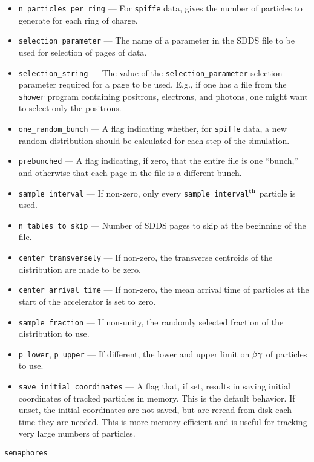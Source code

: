 \documentclass[11pt]{article}
\begin{document}
\begin{itemize}
\item \verb|n_particles_per_ring| --- For {\tt spiffe} data, gives the number of particles to
generate for each ring of charge.
\item \verb|selection_parameter| --- The name of a parameter in the SDDS file to be used for selection
of pages of data.
\item \verb|selection_string| --- The value of the
\verb|selection_parameter| selection parameter required for a page to
be used.  E.g., if one has a file from the {\tt shower} program
containing positrons, electrons, and photons, one might want to select
only the positrons.
\item \verb|one_random_bunch| --- A flag indicating whether, for {\tt spiffe} data, a new random
distribution should be calculated for each step of the simulation.
\item \verb|prebunched| --- A flag indicating, if zero, that the entire file is one ``bunch,'' and otherwise that each page in the file is a different bunch.
\item \verb|sample_interval| --- If non-zero, only every \verb|sample_interval|$^{\rm th}$ particle is used.
\item \verb|n_tables_to_skip| --- Number of SDDS pages to skip at the beginning of the file.
\item \verb|center_transversely| --- If non-zero, the transverse centroids of the distribution are made to be zero.
\item \verb|center_arrival_time| --- If non-zero, the mean arrival time of particles at the start of the
accelerator is set to zero.
\item \verb|sample_fraction| --- If non-unity, the randomly selected fraction of the distribution to use.
\item \verb|p_lower|, \verb|p_upper| --- If different, the lower and upper limit on ${\rm \beta\gamma}$ of particles to use.
\item \verb|save_initial_coordinates| --- A flag that, if set, results in saving initial coordinates
of tracked particles in memory.  This is the default behavior.  If unset, the initial coordinates
are not saved, but are reread from disk each time they are needed.  This is more memory efficient
and is useful for tracking very large numbers of particles.
\end{itemize}

\begin{latexonly}
\newpage
\begin{center}{\Large\verb|semaphores|}\end{center}
\end{latexonly}
\end{document}

